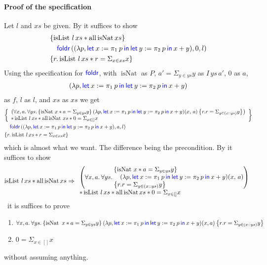\paragraph*{Proof of the  specification}
Let $l$ and  $xs$ be given. By  it suffices to show
\begin{align*}
  \hoareV{ \operatorname{isList} \, l\, xs \ast \operatorname{all} \operatorname{isNat} xs}
  {\langkw{foldr}\left((\lambda p, \Let x = \Proj{1} p in \Let y = \Proj{2} p in x + y), 0, l\right)}
  {r.  \operatorname{isList} \, l\, xs \ast r = \Sigma_{x \in xs} x}
\end{align*}
Using the specification for $\textsf{\color{blue} foldr}$, with $\operatorname{isNat}$ as $P$, $a' = \Sigma_{y \in ys } y$ as $I \, ys \, a'$, $0$ as $a$,
\begin{align*}
  (\lambda p, \Let x = \Proj{1} p in \Let y = \Proj{2} p in x + y)
\end{align*}
as $f$, $l$ as $l$, and $xs$ as $xs$ we get 
\begin{align*}
\hoareV{ \begin{array}{l}
\left( \All x, a. \All ys.  \hoare{\operatorname{isNat}\, x \ast a = \Sigma_{y \in ys} y}{(\lambda p, \Let x = \Proj{1} p in \Let y = \Proj{2} p in x + y) (x, \, a)}{r. r = \Sigma_{y\in (x::ys)}y} \right) \\
\ast \operatorname{isList} \, l\, xs \ast \operatorname{all} \operatorname{isNat}\, xs \ast 0 = \Sigma_{x \in []} x\end{array}}
{\langkw{foldr}\left((\lambda p, \Let x = \Proj{1} p in \Let y = \Proj{2} p in x + y), a, l\right)}
{r.  \operatorname{isList} \, l\, xs \ast r = \Sigma_{x \in xs} x}
\end{align*}
which is almost what we want. The difference being the precondition. By  it suffices to show
\begin{align*}
\operatorname{isList} \, l\, xs \ast \operatorname{all} \operatorname{isNat} xs \implies 
\begin{array}{l}
\left( \All x, a. \All ys.  \hoareV{\operatorname{isNat}\, x \ast a = \Sigma_{y \in ys} y}{(\lambda p, \Let x = \Proj{1} p in \Let y = \Proj{2} p in x + y) (x, \, a)}{r. r = \Sigma_{y\in (x::ys)}y} \right) \\
\ast \operatorname{isList} \, l\, xs \ast \operatorname{all} \operatorname{isNat} xs \ast 0 = \Sigma_{x \in []} x\end{array}
\end{align*}
\ie{}~it is suffices to prove  
\begin{enumerate}
\item $\All x, a. \All ys. \hoare{\operatorname{isNat}\ x \ast a = \Sigma_{y \in ys} y}{(\lambda p, \Let x = \Proj{1} p in \Let y = \Proj{2} p in x + y) (x, a)}{r. r = \Sigma_{y\in (x::ys)}y}$
  \label{enum:item1}
\item $0 = \Sigma_{x \in []} x$
\end{enumerate}
without assuming anything. 

